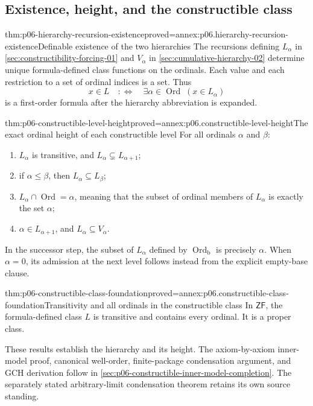 \subsection{Existence, height, and the constructible class}

\begin{hbtheorem}{thm:p06-hierarchy-recursion-existence}{proved=annex:p06.hierarchy-recursion-existence}{Definable existence of the two hierarchies}
The recursions defining \(L_\alpha\) in
\cref{sec:constructibility-forcing-01} and \(V_\alpha\) in
\cref{sec:cumulative-hierarchy-02} determine unique formula-defined
class functions on the ordinals.  Each value and each restriction
to a set of ordinal indices is a set.  Thus
\[
 x\in L\quad:\Longleftrightarrow\quad
   \exists\alpha\in\operatorname{Ord}\;(x\in L_\alpha)
\]
is a first-order formula after the hierarchy abbreviation is expanded.
\end{hbtheorem}

\begin{hbtheorem}{thm:p06-constructible-level-height}{proved=annex:p06.constructible-level-height}{The exact ordinal height of each constructible level}
For all ordinals \(\alpha\) and \(\beta\):
\begin{enumerate}
 \item \(L_\alpha\) is transitive, and
       \(L_\alpha\subsetneq L_{\alpha+1}\);
 \item if \(\alpha\leq\beta\), then
       \(L_\alpha\subseteq L_\beta\);
 \item \(L_\alpha\cap\operatorname{Ord}=\alpha\), meaning that
       the subset of ordinal members of \(L_\alpha\) is exactly
       the set \(\alpha\);
 \item \(\alpha\in L_{\alpha+1}\), and
       \(L_\alpha\subseteq V_\alpha\).
\end{enumerate}
In the successor step, the subset of \(L_\alpha\) defined by
\(\operatorname{Ord}_{\mathrm b}\) is precisely \(\alpha\).
When \(\alpha=0\), its admission at the next level follows instead
from the explicit empty-base clause.
\end{hbtheorem}

\begin{hbcorollary}{thm:p06-constructible-class-foundation}{proved=annex:p06.constructible-class-foundation}{Transitivity and all ordinals in the constructible class}
In \(\mathsf{ZF}\), the formula-defined class \(L\) is transitive and
contains every ordinal.  It is a proper class.
\end{hbcorollary}

These results establish the hierarchy and its height.
The axiom-by-axiom inner-model proof, canonical well-order,
finite-package condensation argument, and GCH derivation follow in
\cref{sec:p06-constructible-inner-model-completion}.
The separately stated arbitrary-limit condensation theorem retains
its own source standing.
